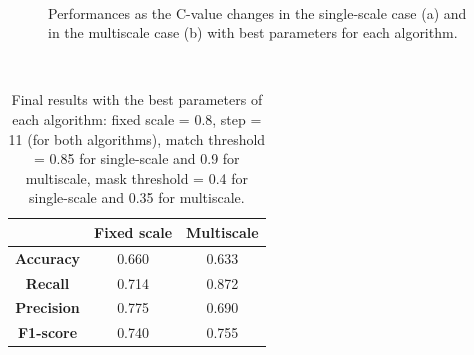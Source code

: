 \documentclass[a4paper,letterpaper, 11pt, onecolumn]{article} %
\begin{document}
\begin{figure}[h!]
\centering
{}\\
\caption{Performances as the C-value changes in the single-scale case (a) and in the multiscale case (b) with best parameters for each algorithm.}
\label{fig:cvalue}
\end{figure}
\
\begin{table}[h!]
\centering
\begin{tabular}{c||c|c}
&\textbf{Fixed scale} & \textbf{Multiscale}\\
\hline \hline 
\textbf{Accuracy} &0.660 & 0.633\\
\textbf{Recall} &0.714  & 0.872\\
\textbf{Precision} & 0.775 & 0.690\\
\textbf{F1-score} & 0.740& 0.755\\
\end{tabular}
\caption{Final results with the best parameters of each algorithm: fixed scale = 0.8, step = 11 (for both algorithms), match threshold = 0.85 for single-scale and 0.9 for multiscale, mask threshold = 0.4 for single-scale and 0.35 for multiscale. }
\label{tab:res}
\end{table}
\end{document}
